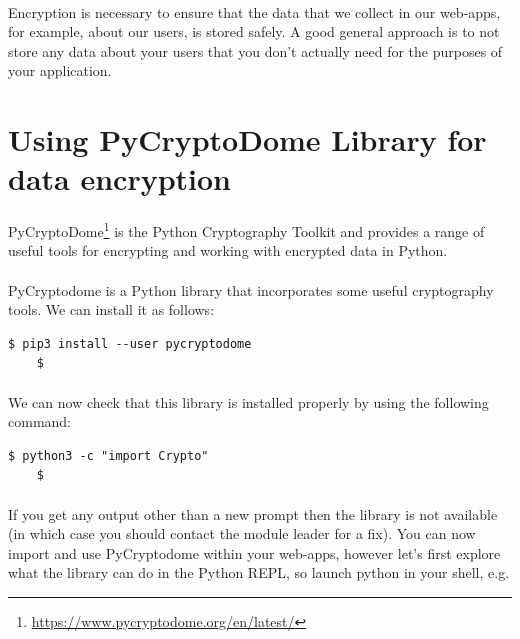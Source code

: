 \documentclass[12pt, a4paper, oneside]{book}
\begin{document}
{\paragraph{} Encryption is necessary to ensure that the data that we collect in our web-apps, for example, about our users, is stored safely. A good general approach is to not store any data about your users that you don't actually need for the purposes of your application.


\section{Using PyCryptoDome Library for data encryption}
\label{pycryptodome}
\paragraph{} PyCryptoDome\footnote{\url{https://www.pycryptodome.org/en/latest/}} is the Python Cryptography Toolkit and provides a range of useful tools for encrypting and working with encrypted data in Python. 

\paragraph{} PyCryptodome is a Python library that incorporates some useful cryptography tools. We can install it as follows:
\begin{lstlisting}[style=DOS]
    $ pip3 install --user pycryptodome
    $
\end{lstlisting}

\paragraph{} We can now check that this library is installed properly by using the following command:
\begin{lstlisting}[style=DOS]
    $ python3 -c "import Crypto"
    $
\end{lstlisting}

\paragraph{} If you get any output other than a new prompt then the library is not available (in which case you should contact the module leader for a fix). You can now import and use PyCryptodome within your web-apps, however let's first explore what the library can do in the Python REPL, so launch python in your shell, e.g.

}
\end{document}
